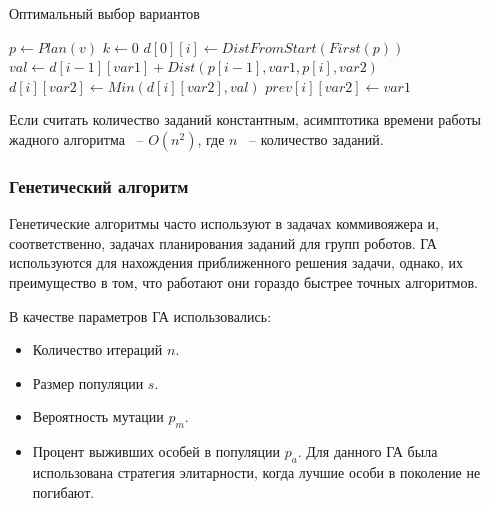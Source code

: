 \documentclass[a4paper,14pt,russian]{article}
\begin{document}
\begin{algorithm}
\caption{Оптимальный выбор вариантов}\label{alg:dynamic}
\begin{algorithmic}[1]
    \State $p \gets Plan(v)$
    \State $k \gets 0$
        \State $d[0][i] \gets DistFromStart(First(p))$
    \EndFor
                \State $val \gets d[i - 1][var1] + Dist(p[i - 1], var1, p[i], var2)$
                    \State $d[i][var2] \gets Min(d[i][var2], val)$
                    \State $prev[i][var2] \gets var1$
                \EndIf
            \EndFor
        \EndFor
    \EndFor
    \State {}
\EndProcedure
\end{algorithmic}
\end{algorithm}

Если считать количество заданий константным, асимптотика времени работы жадного алгоритма ~-- $O(n^2)$, где $n$ ~-- количество заданий.


\subsubsection{Генетический алгоритм}
Генетические алгоритмы часто используют в задачах коммивояжера и, соответственно, задачах планирования заданий для групп роботов. ГА используются для нахождения приближенного решения задачи, однако, их преимущество в том, что работают они гораздо быстрее точных алгоритмов.

В качестве параметров ГА использовались:
\begin{itemize}
\item Количество итераций $n$.
\item Размер популяции $s$.
\item Вероятность мутации $p_m$.
\item Процент выживших особей в популяции $p_a$. Для данного ГА была использована стратегия элитарности, когда лучшие особи в поколение не погибают.
\end{itemize}
\end{document}
